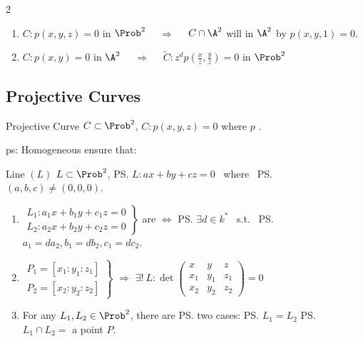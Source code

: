 \documentclass{note}
\begin{document}
\begin{multicols}{2}
\begin{MyTh}{}
        \begin{enumerate}
            \item $C:p(x,y,z)=0$ in $\Prob^2$ \ \ $\Rightarrow$ \ \ $C\cap \A^2$ will in $\A^2$ by $p(x,y,1)=0$. \quad {}
            \item $C:p(x,y)=0$ in $\A^2$ \ \ $\Rightarrow$ \ \ $\tilde{C}: z^d p(\frac{x}{z},\frac{y}{z})=0$ in $\Prob^2$ \quad {}
        \end{enumerate}
    \end{MyTh}


    \subsection{Projective Curves}

    \begin{MyTh}{Projective Curve}
        $C\subset \Prob^2$, $C: p(x,y,z)=0$ where $p$ .

        \quad ps: Homogeneous ensure that: 
    \end{MyTh}

    \begin{MyTh}{Line $(L)$}
        $L\subset \Prob^2$, \ps{$L: ax+by+cz=0$} \ where \ \ps{$(a,b,c)\neq(0,0,0)$}.

        \begin{enumerate}
            \item $\left.\begin{smallmatrix}
                L_1: a_1x+b_1y+c_1z=0 \\
                L_2: a_2x+b_2y+c_2z=0
            \end{smallmatrix}\right\}$ are  $\Leftrightarrow$ \ps{\tiny $\exists d\in k^*$} \ s.t. \ \ps{$a_1=da_2, b_1=db_2, c_1=dc_2$.}
            \item $\left.\begin{smallmatrix}
                P_1=[x_1:y_1:z_1] \\
                P_2=[x_2:y_2:z_2]
            \end{smallmatrix}\right\}$  $\Rightarrow$ $\exists ! \ L:\det\left(\begin{smallmatrix}
                x & y & z \\
                x_1 & y_1 & z_1 \\
                x_2 & y_2 & z_2
            \end{smallmatrix}\right)=0$ 
            \item For any $L_1,L_2\in \Prob^2$, there are \ps{two} cases: \quad
             \ps{$L_1=L_2$} \quad {} \ps{$L_1\cap L_2=$ a point $P$.}
        \end{enumerate}
    \end{MyTh}


\end{multicols}
\end{document}
